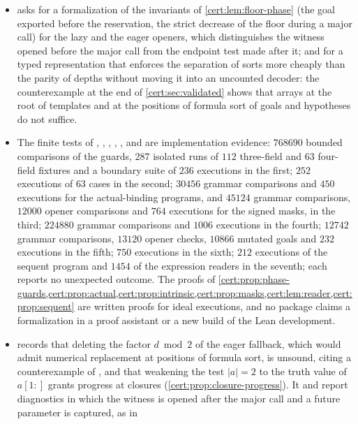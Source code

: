 \begin{itemize}
the partial opener, the independence of the mode and the relation of canonical stacks.
\item {} asks for a formalization of the invariants of
\cref{cert:lem:floor-phase} (the goal exported before the reservation, the strict
decrease of the floor during a major call) for the lazy and the eager openers, which
distinguishes the witness opened before the major call from the endpoint test made
after it; and for a typed representation that enforces the separation of sorts more
cheaply than the parity of depths without moving it into an uncounted decoder: the
counterexample at the end of \cref{cert:sec:validated} shows that arrays at the root
of templates and at the positions of formula sort of goals and hypotheses do not
suffice.
\item The finite tests of , ,
, , ,
 and  are implementation evidence:
$768690$ bounded comparisons of the guards, $287$ isolated runs of $112$ three-field and
$63$ four-field fixtures and a boundary suite of $236$ executions in the first; $252$
executions of $63$ cases in the second; $30456$ grammar comparisons and $450$ executions
for the actual-binding programs, and $45124$ grammar comparisons, $12000$ opener
comparisons and $764$ executions for the signed masks, in the third; $224880$ grammar
comparisons and $1006$ executions in the fourth; $12742$ grammar comparisons, $13120$
opener checks, $10866$ mutated goals and $232$ executions in the fifth; $750$ executions in
the sixth; $212$ executions of the sequent program and $1454$ of the expression readers in
the seventh; each reports no unexpected outcome. The proofs of
\cref{cert:prop:phase-guards,cert:prop:actual,cert:prop:intrinsic,cert:prop:masks,cert:lem:reader,cert:prop:sequent}
are written proofs for ideal executions, and no package claims a formalization in a proof
assistant or a new build of the Lean development.
\item {} records that deleting the factor $d\bmod 2$ of the eager
fallback, which would admit numerical replacement at positions of formula sort, is
unsound, citing a counterexample of , and that weakening the test
$\lvert a\rvert=2$ to the truth value of $a[1{:}]$ grants progress at closures
(\cref{cert:prop:closure-progress}). It and  report diagnostics in
which the witness is opened after the major call and a future parameter is captured, as in

\end{itemize}

